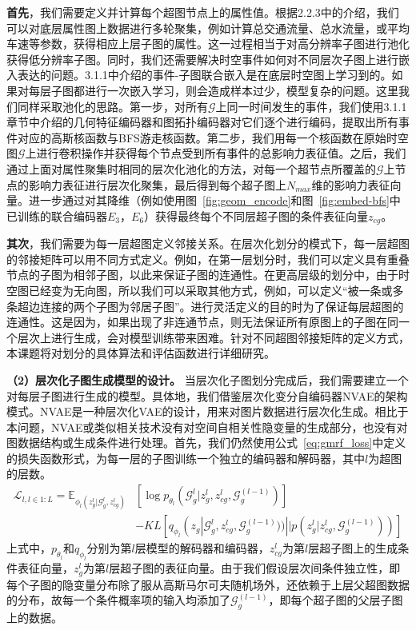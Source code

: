 \documentclass[12pt,UTF8,AutoFakeBold=2,a4paper]{ctexart} %
\begin{document}
\textbf{首先}，我们需要定义并计算每个超图节点上的属性值。根据2.2.3中的介绍，我们可以对底层属性图上数据进行多轮聚集，例如计算总交通流量、总水流量，或平均车速等参数，获得相应上层子图的属性。这一过程相当于对高分辨率子图进行池化获得低分辨率子图。同时，我们还需要解决时空事件如何对不同层次子图上进行嵌入表达的问题。3.1.1中介绍的事件-子图联合嵌入是在底层时空图上学习到的。如果对每层子图都进行一次嵌入学习，则会造成样本过少，模型复杂的问题。这里我们同样采取池化的思路。第一步，对所有$\mathcal{G}$上同一时间发生的事件，我们使用3.1.1章节中介绍的几何特征编码器和图拓扑编码器对它们逐个进行编码，提取出所有事件对应的高斯核函数与BFS游走核函数。第二步，我们用每一个核函数在原始时空图$\mathcal{G}$上进行卷积操作并获得每个节点受到所有事件的总影响力表征值。之后，我们通过上面对属性聚集时相同的层次化池化的方法，对每一个超节点所覆盖的$\mathcal{G}$上节点的影响力表征进行层次化聚集，最后得到每个超子图上$N_{max}$维的影响力表征向量。进一步通过对其降维（例如使用图~\ref{fig:geom_encode}和图~\ref{fig:embed-bfs}中已训练的联合编码器$E_3$，$E_6$）获得最终每个不同层超子图的条件表征向量$z_{cg}$。

\textbf{其次}，我们需要为每一层超图定义邻接关系。在层次化划分的模式下，每一层超图的邻接矩阵可以用不同方式定义。例如，在第一层划分时，我们可以定义具有重叠节点的子图为相邻子图，以此来保证子图的连通性。在更高层级的划分中，由于时空图已经变为无向图，所以我们可以采取其他方式，例如，可以定义“被一条或多条超边连接的两个子图为邻居子图”。进行灵活定义的目的时为了保证每层超图的连通性。这是因为，如果出现了非连通节点，则无法保证所有原图上的子图在同一个层次上进行生成，会对模型训练带来困难。针对不同超图邻接矩阵的定义方式，本课题将对划分的具体算法和评估函数进行详细研究。

\textbf{（2）层次化子图生成模型的设计。} 当层次化子图划分完成后，我们需要建立一个对每层子图进行生成的模型。具体地，我们借鉴层次化变分自编码器NVAE的架构模式。NVAE是一种层次化VAE的设计，用来对图片数据进行层次化生成。相比于本问题，NVAE或类似相关技术没有对空间自相关性隐变量的生成部分，也没有对图数据结构或生成条件进行处理。首先，我们仍然使用公式~\ref{eq:gmrf_loss}中定义的损失函数形式，为每一层的子图训练一个独立的编码器和解码器，其中$l$为超图的层数。
\begin{equation}
\begin{split}
    \mathcal{L}_{l,l\in 1:L} = \mathbb{E}_{{\phi_l}(z^l_g|\mathcal{G}^l_g,z^l_{cg})
    }&[\log p_{\theta_l}(\mathcal{G}^l_g|z^l_g,z^l_{cg},\mathcal{G}^{(l-1)}_g)]\\ &-KL[q_{\phi_l}(z_g|\mathcal{G}^l_g,z^l_{cg},\mathcal{G}^{(l-1)}_g))||p(z^l_g|z^l_{cg}, \mathcal{G}^{(l-1)}_g))]
\end{split}
    \label{eq:hgmrf_loss}
\end{equation}
上式中，$p_{\theta_l}$和$q_{\phi_l}$分别为第$l$层模型的解码器和编码器，$z^l_{cg}$为第$l$层超子图上的生成条件表征向量，$z^l_g$为第$l$层超子图的表征向量。由于我们假设层次间条件独立性，即每个子图的隐变量分布除了服从高斯马尔可夫随机场外，还依赖于上层父超图数据的分布，故每一个条件概率项的输入均添加了$\mathcal{G}^{(l-1)}_g$，即每个超子图的父层子图上的数据。
\end{document}

